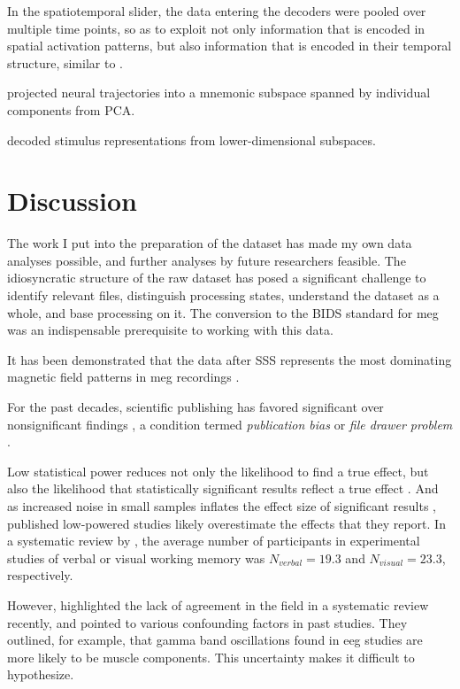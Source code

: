 In the spatiotemporal slider, the data entering the decoders were pooled over multiple time points, so as to exploit not only information that is encoded in spatial activation patterns, but also information that is encoded in their temporal structure, similar to \citep{muhle2021hierarchy}.


\citet{murray2017stable} projected neural trajectories into a mnemonic subspace spanned by individual components from PCA.

\citet{murray2017stable} decoded stimulus representations from lower-dimensional subspaces.

\pagebreak



\section{Discussion}


The work I put into the preparation of the dataset has made my own data analyses possible, and further analyses by future researchers feasible.
The idiosyncratic structure of the raw dataset has posed a significant challenge to identify relevant files, distinguish processing states, understand the dataset as a whole, and base processing on it.
The conversion to the \gls{BIDS} standard for \gls{meg} was an indispensable prerequisite to working with this data.


It has been demonstrated that the data after \gls{SSS} represents the most dominating magnetic field patterns in \gls{meg} recordings \citep{garces2017choice}.


For the past decades, scientific publishing has favored significant over nonsignificant findings \citep{dwan2008systematic}, a condition termed \textit{publication bias} or \textit{file drawer problem} \citep{rosenthal1979file}.





Low statistical power reduces not only the likelihood to find a true effect, but also the likelihood that statistically significant results reflect a true effect \citep{button2013power}.
And as increased noise in small samples inflates the effect size of significant results \citep{loken2017measurement}, published low-powered studies likely overestimate the effects that they report.
In a systematic review by \citet{pavlov2022oscillatory}, the average number of participants in experimental studies of verbal or visual working memory was $N_{verbal}=19.3$ and $N_{visual}=23.3$, respectively.

However, \citet{pavlov2022oscillatory} highlighted the lack of agreement in the field in a systematic review recently, and pointed to various confounding factors in past studies. They outlined, for example, that gamma band oscillations found in \gls{eeg} studies are more likely to be muscle components.
This uncertainty makes it difficult to hypothesize.
